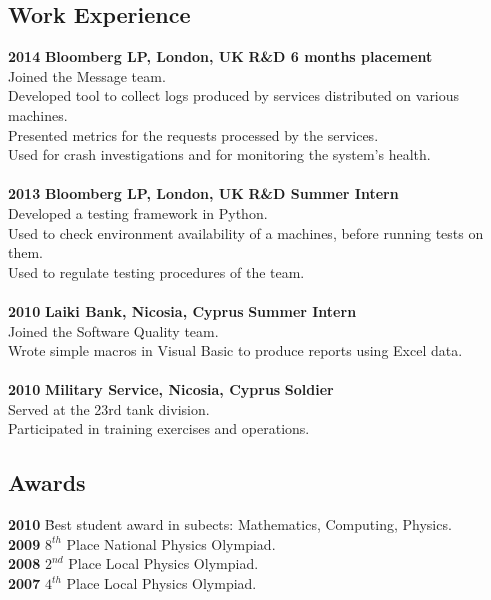 \documentclass[a4paper,10pt]{article}
\begin{document}
\subsection*{Work Experience}
\begin{tabbing}
{\bf 2014} \hspace{49pt} \= {\bf Bloomberg LP, London, UK} \` {\bf R\&D 6 months placement}\\
\>Joined the Message team.\\
\>Developed tool to collect logs produced by services distributed on various machines.\\
\>Presented metrics for the requests processed by the services.\\
\>Used for crash investigations and for monitoring the system's health.\\
\\
{\bf 2013} \hspace{49pt} \= {\bf Bloomberg LP, London, UK} \` {\bf R\&D Summer Intern}\\
\>Developed a testing framework in Python.\\
\>Used to check environment availability of a machines, before running tests on them.\\
\>Used to regulate testing procedures of the team.\\
\\
{\bf 2010} \> {\bf Laiki Bank, Nicosia, Cyprus} \` {\bf Summer Intern}\\
\>Joined the Software Quality team.\\
\>Wrote simple macros in Visual Basic to produce reports using Excel data.\\
\\
{\bf 2010} \> {\bf Military Service, Nicosia, Cyprus} \` {\bf Soldier}\\
\>Served at the 23rd  tank division.\\
\>Participated in training exercises and operations.\\
\end{tabbing}


\onehalfspacing

\subsection*{Awards}
\begin{tabbing}
{\bf 2010} \hspace{49pt} \= Best student award in subects: Mathematics, Computing, Physics.\\
{\bf 2009} \> $8^{th}$ Place National Physics Olympiad.\\
{\bf 2008} \> $2^{nd}$ Place Local Physics Olympiad.\\
{\bf 2007} \> $4^{th}$ Place Local Physics Olympiad.\\
\end{tabbing}
\end{document}
